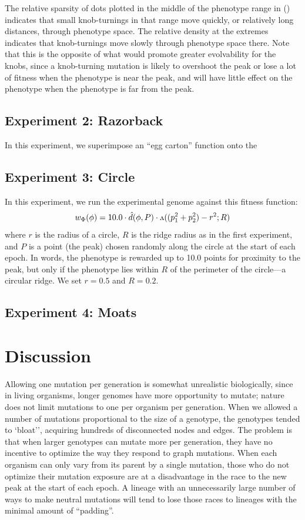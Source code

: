 \documentclass[letterpaper]{article}
\newcommand{\invv}{\ensuremath{\rotatebox[origin=c]{180}{\textrm{v}}}\xspace}
\begin{document}
The relative sparsity of dots plotted in the middle of the phenotype range
in () indicates that small knob-turnings in that range
move quickly, or relatively long distances, through phenotype space. The
relative density at the extremes indicates that knob-turnings move slowly
through phenotype space there. Note that this is the opposite of what would
promote greater evolvability for the knobs, since a knob-turning mutation is
likely to overshoot the peak or lose a lot of fitness when the phenotype is
near the peak, and will have little effect on the phenotype when the phenotype
is far from the peak.

\subsection{Experiment 2: Razorback}

In this experiment, we superimpose an ``egg carton'' function onto the 

\subsection{Experiment 3: Circle}

In this experiment, we run the experimental genome against this fitness
function:
\[
  w_\Phi(\phi) = 10.0 \cdot \hat{d}(\phi, P)
                      \cdot \invv((p_1^2 + p_2^2) - r^2; R)
\]
where $r$ is the radius of a circle, $R$ is the ridge radius as in the first
experiment, and $P$ is a point (the peak) chosen randomly along the circle
at the start of each epoch. In words, the phenotype is rewarded up to 10.0
points for proximity to the peak, but only if the phenotype lies within $R$
of the perimeter of the circle---a circular ridge. We set $r=0.5$ and $R=0.2$.

\subsection{Experiment 4: Moats}

\section{Discussion}

Allowing one mutation per generation is somewhat unrealistic biologically,
since in living organisms, longer genomes have more opportunity to mutate;
nature does not limit mutations to one per organism per generation. When we
allowed a number of mutations proportional to the size of a genotype, the
genotypes tended to `bloat'', acquiring hundreds of disconnected nodes and
edges. The problem is that when larger genotypes can mutate more per generation,
they have no incentive to optimize the way they respond to graph mutations.
When each organism can only vary from its parent by a single mutation, those
who do not optimize their mutation exposure are at a disadvantage in the race
to the new peak at the start of each epoch. A lineage with an unnecessarily
large number of ways to make neutral mutations will tend to lose those races to
lineages with the minimal amount of ``padding''.
\end{document}
